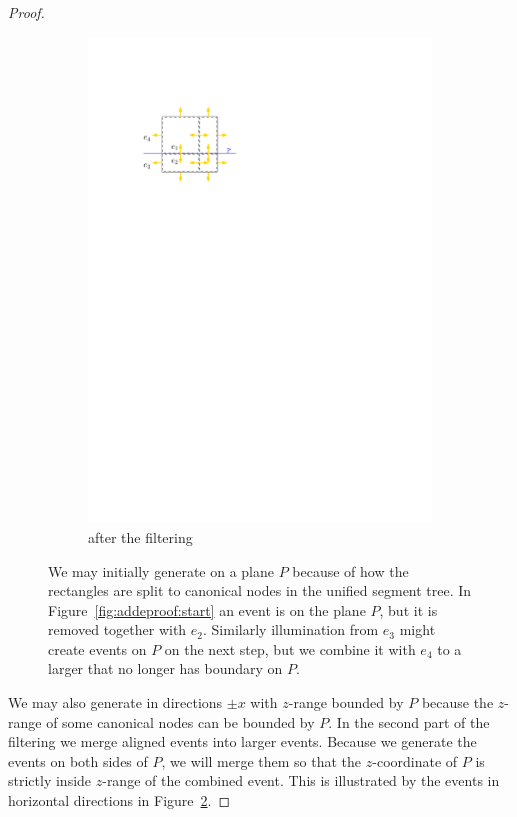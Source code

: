 \documentclass[english,gradu]{tktltiki2018}
\begin{document}
\begin{proof}
\begin{figure}
\begin{subfigure}[t]{0.3\textwidth}
		\includegraphics[width=\textwidth,page=2]{fig/addeproof}
		\caption{\addEs after the filtering}\label{fig:addeproof:end}
	\end{subfigure}
	\caption{We may initially generate \addEs on a plane $P$ because of how the rectangles are split to canonical nodes in the unified segment tree.
	In Figure~\ref{fig:addeproof:start} an event is on the plane $P$, but it is removed together with $e_2$.
	Similarly illumination from $e_3$ might create events on $P$ on the next step, but we combine it with $e_4$ to a larger \addE that no longer has boundary on $P$.
	}\label{fig:addeproof}
\end{figure}

We may also generate \addEs in directions $\pm x$ with $z$-range bounded by $P$ because the $z$-range of some canonical nodes can be bounded by $P$.
In the second part of the filtering we merge aligned events into larger events.
Because we generate the events on both sides of $P$, we will merge them so that the $z$-coordinate of $P$ is strictly inside $z$-range of the combined event.
This is illustrated by the events in horizontal directions in Figure~\ref{fig:addeproof}.


\end{proof}
\end{document}

